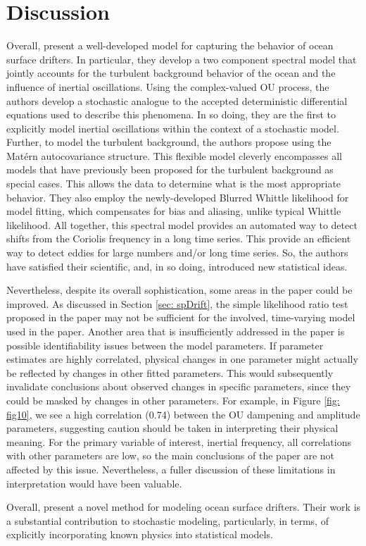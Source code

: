 \documentclass{stat572Style}
\begin{document}
\section{Discussion}
\par Overall, \citet{Sykulski2016} present a  well-developed model for capturing the behavior of ocean surface drifters.
 In particular, they develop a two component spectral model that jointly accounts for the turbulent background behavior of the ocean and the influence of inertial oscillations. 
 Using the complex-valued OU process, the authors develop a stochastic analogue to the accepted deterministic differential equations used to describe this phenomena. 
 In so doing, they are the first to explicitly model inertial oscillations within the context of a stochastic model. 
 Further, to model the turbulent background, the authors propose using the  Mat\'{e}rn autocovariance structure.
  This flexible model cleverly encompasses all models that have previously been proposed for the turbulent background as special cases.
  This allows the data to determine what is the most appropriate behavior. 
   They also employ the newly-developed Blurred Whittle likelihood for model fitting, which compensates for bias and aliasing, unlike typical Whittle likelihood. 
   All together, this spectral model provides an automated way to detect shifts from the Coriolis frequency in a long time series. 
This provide an efficient way to detect eddies for large numbers and/or long time series. 
So, the authors have  satisfied their scientific, and, in so doing, introduced new statistical ideas.

Nevertheless, despite its overall sophistication, some areas in the paper could be improved. 
As discussed in Section \ref{sec: spDrift}, the simple likelihood ratio test proposed in the paper may not be sufficient for the involved, time-varying model used in the paper.  
Another area that is insufficiently addressed in the paper is possible identifiability issues between the model parameters. 
 If parameter estimates are highly correlated, physical changes in one parameter might actually be reflected by changes in other fitted parameters.
  This would subsequently invalidate conclusions about observed changes in specific parameters, since they could be masked by changes in other parameters. 
 For example, in Figure \ref{fig: fig10}, we see a high correlation (0.74) between the OU dampening and amplitude parameters, suggesting caution should be taken in interpreting their physical meaning. 
 For the primary variable of interest, inertial frequency, all correlations with other parameters are low, so the main conclusions of the paper are not affected by this issue. 
Nevertheless, a fuller discussion of these limitations in interpretation would have been valuable.
\par Overall, \citet{Sykulski2016} present a novel method for modeling ocean surface drifters.
 Their work is a substantial contribution to stochastic modeling, particularly, in terms, of explicitly incorporating known physics into statistical models. 
\end{document}
